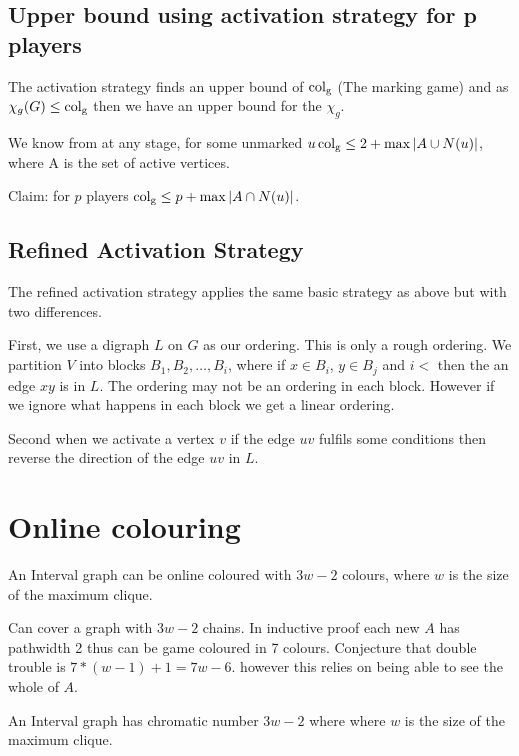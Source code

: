 \subsection{Upper bound using activation strategy for p players}

The activation strategy finds an upper bound of $\operatorname{col_g}$ (The marking game) and as $\chi_g(G) \leq \operatorname{col_g}$ then we have an upper bound for the $\chi_g$. 

We know from \cite{Zhu2008} at any stage, for some unmarked $u \operatorname{col_g} \leq 2 + \max{\left| A \cup N(u)\right| }$, where A is the set of active vertices.

Claim: for $p$ players $\operatorname{col_g} \leq p + \max{ \left| A \cap N(u)\right| }$. 

\subsection{Refined Activation Strategy}
The refined activation strategy applies the same basic strategy as above but with two differences. 

First, we use a digraph $L$ on $G$ as our ordering. This is only a rough ordering. We partition $V$ into blocks $B_1,B_2,\dots,B_i$, where if $x \in B_i$, $y \in B_j$ and $i <$ then the an edge $xy$ is in $L$. The ordering may not be an ordering in each block. However if we ignore what happens in each block we get a linear ordering.

Second when we activate a vertex $v$ if the edge $uv$ fulfils some conditions then reverse the direction of the edge $uv$ in $L$.

\section{Online colouring}

\begin{theorem}
    An Interval graph can be online coloured with $3w-2$ colours, where $w$ is the size of the maximum clique.
\end{theorem}

Can cover a graph with $ 3w-2 $ chains. In inductive proof each new $ A $ has pathwidth 2 thus can be game coloured in 7 colours. Conjecture that double trouble is $ 7*(w-1)+1 = 7w-6 $. however this relies on being able to see the whole of $ A $.

\begin{theorem} \label{thm_intervalKierstand}
    An Interval graph has chromatic number $3w-2$ where where $w$ is the size of the maximum clique.
\end{theorem}

